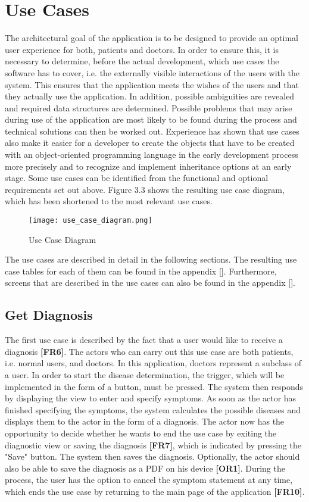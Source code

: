 \section{Use Cases}
The architectural goal of the application is to be designed to provide an optimal user experience for both, patients and doctors. In order to ensure this, it is necessary to determine, before the actual development, which use cases the software has to cover, i.e. the externally visible interactions of the users with the system. This ensures that the application meets the wishes of the users and that they actually use the application. In addition, possible ambiguities are revealed and required data structures are determined. Possible problems that may arise during use of the application are most likely to be found during the process and technical solutions can then be worked out. Experience has shown that use cases also make it easier for a developer to create the objects that have to be created with an object-oriented programming language in the early development process more precisely and to recognize and implement inheritance options at an early stage. Some use cases can be identified from the functional and optional requirements set out above. Figure 3.3 shows the resulting use case diagram, which has been shortened to the most relevant use cases. 

\begin{figure}[h]
	\centering
	\texttt{[image: use\_case\_diagram.png]}
	\caption[Use Case Diagram]{Use Case Diagram}
\end{figure}

The use cases are described in detail in the following sections. The resulting use case tables for each of them can be found in the appendix []. Furthermore, screens that are described in the use cases can also be found in the appendix [].

\subsection{Get Diagnosis}
The first use case is described by the fact that a user would like to receive a diagnosis \textbf{[FR6]}. The actors who can carry out this use case are both patients, i.e. normal users, and doctors. In this application, doctors represent a subclass of a user. In order to start the disease determination, the trigger, which will be implemented in the form of a button, must be pressed. The system then responds by displaying the view to enter and specify symptoms. As soon as the actor has finished specifying the symptoms, the system calculates the possible diseases and displays them to the actor in the form of a diagnosis. The actor now has the opportunity to decide whether he wants to end the use case by exiting the diagnostic view or saving the diagnosis \textbf{[FR7]}, which is indicated by pressing the "Save" button. The system then saves the diagnosis. Optionally, the actor should also be able to save the diagnosis as a PDF on his device \textbf{[OR1]}. During the process, the user has the option to cancel the symptom statement at any time, which ends the use case by returning to the main page of the application \textbf{[FR10]}.

